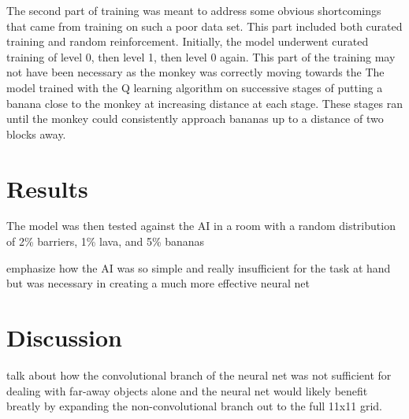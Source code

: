 \documentclass[%
 reprint,
nofootinbib,
 amsmath,amssymb,
 aps,
]{revtex4-1}
\begin{document}
The second part of training was meant to address some obvious shortcomings that came from training on such a poor data set. This part included both curated training and random reinforcement. Initially, the model underwent curated training of level 0, then level 1, then level 0 again. This part of the training may not have been necessary as the monkey was correctly moving towards the The model trained with the Q learning algorithm on successive stages of putting a banana close to the monkey at increasing distance at each stage. These stages ran until the monkey could consistently approach bananas up to a distance of two blocks away.



\section{\label{sec:Results}Results}

The model was then tested against the AI in a room with a random distribution of 2\% barriers, 1\% lava, and 5\% bananas

emphasize how the AI was so simple and really insufficient for the task at hand but was necessary in creating a much more effective neural net

\section{\label{sec:Discussion}Discussion}

talk about how the convolutional branch of the neural net was not sufficient for dealing with far-away objects alone and the neural net would likely benefit breatly by expanding the non-convolutional branch out to the full 11x11 grid.



\end{document}
